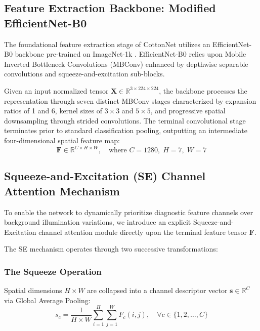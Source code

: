 \documentclass[journal,10pt,twocolumn]{IEEEtran}
\begin{document}
\subsection{Feature Extraction Backbone: Modified EfficientNet-B0}
The foundational feature extraction stage of CottonNet utilizes an EfficientNet-B0 backbone pre-trained on ImageNet-1k \cite{tan2019efficientnet}. EfficientNet-B0 relies upon Mobile Inverted Bottleneck Convolutions (MBConv) enhanced by depthwise separable convolutions and squeeze-and-excitation sub-blocks.

Given an input normalized tensor $\mathbf{X} \in \mathbb{R}^{3 \times 224 \times 224}$, the backbone processes the representation through seven distinct MBConv stages characterized by expansion ratios of 1 and 6, kernel sizes of $3 \times 3$ and $5 \times 5$, and progressive spatial downsampling through strided convolutions. The terminal convolutional stage terminates prior to standard classification pooling, outputting an intermediate four-dimensional spatial feature map:
\begin{equation}
\mathbf{F} \in \mathbb{R}^{C \times H \times W}, \quad \text{where } C = 1280, \; H = 7, \; W = 7
\end{equation}

\subsection{Squeeze-and-Excitation (SE) Channel Attention Mechanism}
To enable the network to dynamically prioritize diagnostic feature channels over background illumination variations, we introduce an explicit Squeeze-and-Excitation channel attention module \cite{hu2020squeeze} directly upon the terminal feature tensor $\mathbf{F}$.

The SE mechanism operates through two successive transformations:

\subsubsection{The Squeeze Operation}
Spatial dimensions $H \times W$ are collapsed into a channel descriptor vector $\mathbf{s} \in \mathbb{R}^C$ via Global Average Pooling:
\begin{equation}
s_c = \frac{1}{H \times W} \sum_{i=1}^H \sum_{j=1}^W F_c(i, j), \quad \forall c \in \{1, 2, \dots, C\}
\end{equation}
\end{document}
